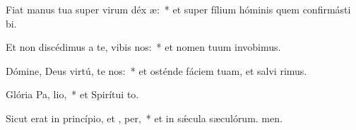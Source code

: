 \item Fiat manus tua super virum déx æ:~* et super fílium hóminis quem confirmásti bi.
\item Et non discédimus a te, vibis nos:~* et nomen tuum invobimus.
\item Dómine, Deus virtú, te nos:~* et osténde fáciem tuam, et salvi rimus.
\item Glória Pa,  lio,~* et Spirítui to.
\item Sicut erat in princípio, et ,  per,~* et in sǽcula sæculórum. men.
